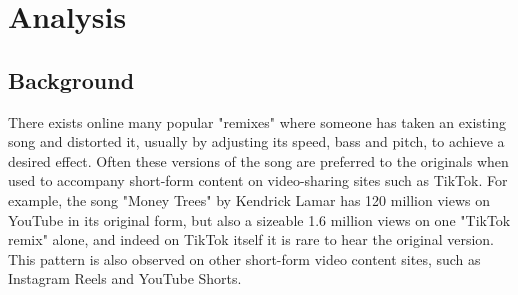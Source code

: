 \section{Analysis}

\subsection{Background}
There exists online many popular "remixes"  where someone has taken an existing song and distorted it, usually by adjusting its speed, bass and pitch, to achieve a desired effect. Often these versions of the song are preferred to the originals when used to accompany short-form content on video-sharing sites such as TikTok. For example,  the song "Money Trees" by Kendrick Lamar has 120 million views on YouTube  in its original form, but also a sizeable 1.6 million views on one "TikTok remix" alone, and indeed on TikTok itself it is rare to hear the original version. This pattern is also observed on other short-form video content sites, such as Instagram Reels and YouTube Shorts.

